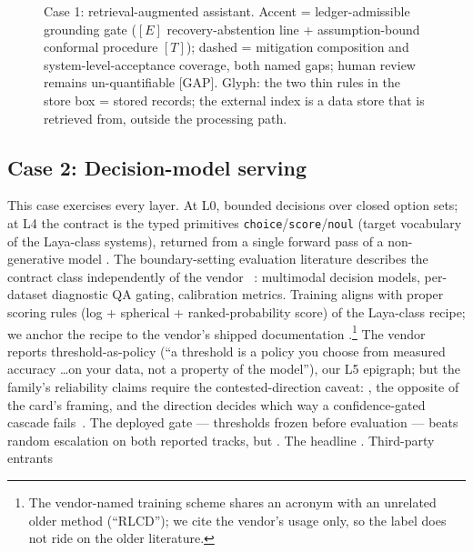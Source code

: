 \begin{figure}[h!]
  \centering
  \resizebox{\linewidth}{!}{}
  \caption{Case 1: retrieval-augmented assistant. Accent = ledger-admissible grounding gate ($[E]$ recovery-abstention line + assumption-bound conformal procedure $[T]$); dashed = mitigation composition and system-level-acceptance coverage, both named gaps; human review remains un-quantifiable [GAP]. Glyph: the two thin rules in the store box = stored records; the external index is a data store that is retrieved from, outside the processing path.}
  \label{fig:case-rag}
\end{figure}

\subsection{Case 2: Decision-model serving}
\label{sec:case-decision}
This case exercises every layer. At L0, bounded decisions over closed option sets; at L4 the
contract is the typed primitives \texttt{choice}/\texttt{score}/\texttt{noul} (target
vocabulary of the Laya-class systems), returned from a single forward pass of a non-generative
model \cite{rauk2026jevbenchmark,id260934024,id261018529}. The boundary-setting evaluation
literature describes the contract class independently of the vendor
~\cite{id261002076,id261013675,id261019811}: multimodal decision models, per-dataset diagnostic
QA gating, calibration metrics. Training aligns with proper scoring rules (log + spherical +
ranked-probability score) of the Laya-class recipe; we anchor the recipe to the vendor's
shipped documentation \evvendor{}.\footnote{The vendor-named training scheme shares an
acronym with an unrelated older method (``RLCD''); we cite the vendor's usage only, so the
label does not ride on the older literature.} The vendor reports threshold-as-policy (``a
threshold is a policy you choose from measured accuracy \ldots on your data, not a property of
the model''), our L5 epigraph; but the family's reliability claims require the
contested-direction caveat: , the opposite of the card's framing, and the
direction decides which way a confidence-gated cascade fails~\cite{id260933843}. The deployed
gate --- thresholds frozen before evaluation --- beats random escalation on both reported
tracks, but  \cite{id260933843}. The headline . Third-party entrants
